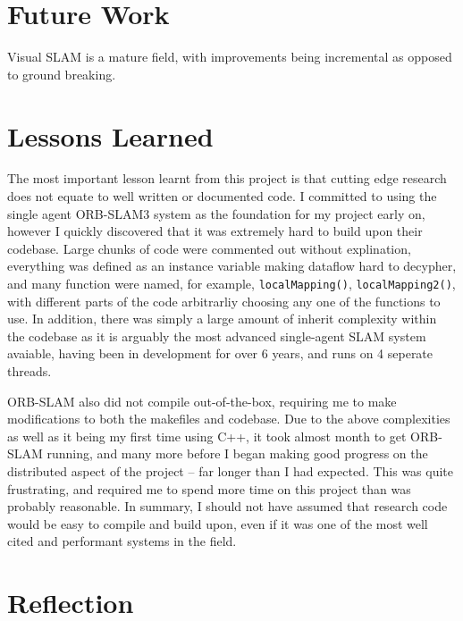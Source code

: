 

\label{sec:5}

\section{Future Work}
\label{sec:future-work}
Visual SLAM is a mature field, with improvements being incremental as opposed to ground breaking.

\section{Lessons Learned}
\label{sec:lessons-learned}
The most important lesson learnt from this project is that cutting edge research does not equate to well written or documented code. I committed to using the single agent ORB-SLAM3 system as the foundation for my project early on, however I quickly discovered that it was extremely hard to build upon their codebase. Large chunks of code were commented out without explination, everything was defined as an instance variable making dataflow hard to decypher, and many function were named, for example, \texttt{localMapping()}, \texttt{localMapping2()}, with different parts of the code arbitrarliy choosing any one of the functions to use. In addition, there was simply a large amount of inherit complexity within the codebase as it is arguably the most advanced single-agent SLAM system avaiable, having been in development for over 6 years, and runs on 4 seperate threads.

ORB-SLAM also did not compile out-of-the-box, requiring me to make modifications to both the makefiles and codebase. Due to the above complexities as well as it being my first time using C++, it took almost month to get ORB-SLAM running, and many more before I began making good progress on the distributed aspect of the project – far longer than I had expected. This was quite frustrating, and required me to spend more time on this project than was probably reasonable. In summary, I should not have assumed that research code would be easy to compile and build upon, even if it was one of the most well cited and performant systems in the field.

\section{Reflection}
\label{sec:reflection}

